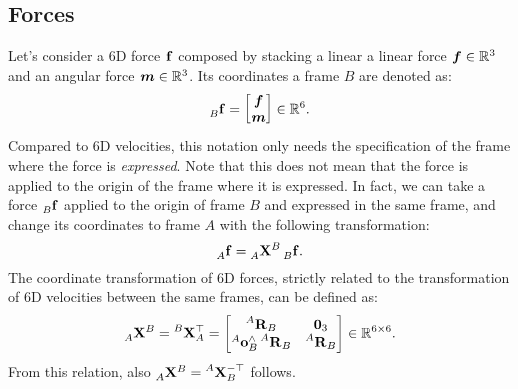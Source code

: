 \subsection{Forces}

Let's consider a 6D force $\forcesix$ composed by stacking a linear a linear force $\forcelin \in \realn^3$ and an angular force $\forceang \in \realn^3$.
Its coordinates \wrtl a frame $B$ are denoted as:
%
\begin{equation*}
    \forcesix[B] =
    \begin{bmatrix}
        \forcelin \\ \forceang
    \end{bmatrix}
    \in \realn^6
    .
\end{equation*}
%
Compared to 6D velocities, this notation only needs the specification of the frame where the force is \emph{expressed}.
Note that this does not mean that the force is applied to the origin of the frame where it is expressed.
In fact, we can take a force $\forcesix[B]$ applied to the origin of frame $B$ and expressed in the same frame, and change its coordinates to frame $A$ with the following transformation:
%
\begin{equation}
    \label{eq:sixd_force_transformation}
    \forcesix[A] = \transfor[A]^B \forcesix[B]
    .
\end{equation}
%
The coordinate transformation of 6D forces, strictly related to the transformation of 6D velocities between the same frames, can be defined as:
%
\begin{equation*}
    \transfor[A]^B = \transvel[B]_A^\top =
    \begin{bmatrix}
        \rot[A]_B & \zeros_{3\time3} \\
        \ori[A]_B^\wedge \rot[A]_B & \rot[A]_B
    \end{bmatrix}
    \in \realn^{6\times6}
    .
\end{equation*}
%
From this relation, also $\transfor[A]^B = \transvel[A]_B^{-\top}$ follows.

